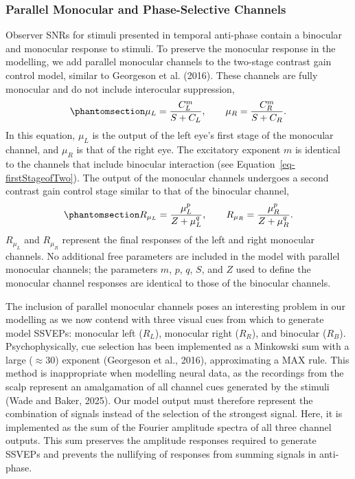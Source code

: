 \documentclass[
  12pt,
]{article}
\begin{document}
\subsubsection{Parallel Monocular and Phase-Selective
Channels}\label{parallel-monocular-and-phase-selective-channels}

Observer SNRs for stimuli presented in temporal anti-phase contain a
binocular and monocular response to stimuli. To preserve the monocular
response in the modelling, we add parallel monocular channels to the
two-stage contrast gain control model, similar to Georgeson et al.
(2016). These channels are fully monocular and do not include
interocular suppression,
\begin{equation}\phantomsection\label{eq-monocFirstStage}{
\mu_L = \frac{C_L^m}{S + C_L}, \qquad  \mu_R = \frac{C_R^m}{S + C_R}.
}\end{equation} In this equation, \(\mu_L\) is the output of the left
eye's first stage of the monocular channel, and \(\mu_R\) is that of the
right eye. The excitatory exponent \(m\) is identical to the channels
that include binocular interaction (see
Equation~\ref{eq-firstStageofTwo}). The output of the monocular channels
undergoes a second contrast gain control stage similar to that of the
binocular channel,
\begin{equation}\phantomsection\label{eq-monocSecondStage}{
R_{\mu_L} = \frac{\mu_L^p}{Z + \mu_L^q}, \qquad  R_{\mu_R} = \frac{\mu_R^p}{Z + \mu_R^q}.
}\end{equation} \(R_{\mu_L}\) and \(R_{\mu_R}\) represent the final
responses of the left and right monocular channels. No additional free
parameters are included in the model with parallel monocular channels;
the parameters \(m\), \(p\), \(q\), \(S\), and \(Z\) used to define the
monocular channel responses are identical to those of the binocular
channels.

The inclusion of parallel monocular channels poses an interesting
problem in our modelling as we now contend with three visual cues from
which to generate model SSVEPs: monocular left (\(R_L\)), monocular
right (\(R_R\)), and binocular (\(R_B\)). Psychophysically, cue
selection has been implemented as a Minkowski sum with a large
(\(\approx 30\)) exponent (Georgeson et al., 2016), approximating a MAX
rule. This method is inappropriate when modelling neural data, as the
recordings from the scalp represent an amalgamation of all channel cues
generated by the stimuli (Wade and Baker, 2025). Our model output must
therefore represent the combination of signals instead of the selection
of the strongest signal. Here, it is implemented as the sum of the
Fourier amplitude spectra of all three channel outputs. This sum
preserves the amplitude responses required to generate SSVEPs and
prevents the nullifying of responses from summing signals in anti-phase.
\end{document}
